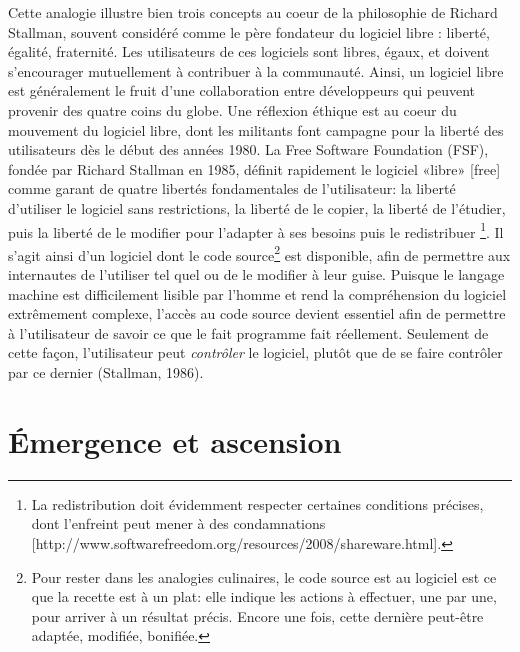\documentclass[
  letterpaper,
]{scrbook}
\begin{document}
Cette analogie illustre bien trois concepts au coeur de la philosophie
de Richard Stallman, souvent considéré comme le père fondateur du
logiciel libre : liberté, égalité, fraternité. Les utilisateurs de ces
logiciels sont libres, égaux, et doivent s'encourager mutuellement à
contribuer à la communauté. Ainsi, un logiciel libre est généralement le
fruit d'une collaboration entre développeurs qui peuvent provenir des
quatre coins du globe. Une réflexion éthique est au coeur du mouvement
du logiciel libre, dont les militants font campagne pour la liberté des
utilisateurs dès le début des années 1980. La Free Software Foundation
(FSF), fondée par Richard Stallman en 1985, définit rapidement le
logiciel «libre» {[}free{]} comme garant de quatre libertés
fondamentales de l'utilisateur: la liberté d'utiliser le logiciel sans
restrictions, la liberté de le copier, la liberté de l'étudier, puis la
liberté de le modifier pour l'adapter à ses besoins puis le redistribuer
\footnote{La redistribution doit évidemment respecter certaines
  conditions précises, dont l'enfreint peut mener à des condamnations
  {[}http://www.softwarefreedom.org/resources/2008/shareware.html{]}.}.
Il s'agit ainsi d'un logiciel dont le code source\footnote{Pour rester
  dans les analogies culinaires, le code source est au logiciel est ce
  que la recette est à un plat: elle indique les actions à effectuer,
  une par une, pour arriver à un résultat précis. Encore une fois, cette
  dernière peut-être adaptée, modifiée, bonifiée.} est disponible, afin
de permettre aux internautes de l'utiliser tel quel ou de le modifier à
leur guise. Puisque le langage machine est difficilement lisible par
l'homme et rend la compréhension du logiciel extrêmement complexe,
l'accès au code source devient essentiel afin de permettre à
l'utilisateur de savoir ce que le fait programme fait réellement.
Seulement de cette façon, l'utilisateur peut \emph{contrôler} le
logiciel, plutôt que de se faire contrôler par ce dernier (Stallman,
1986).

\hypertarget{uxe9mergence-et-ascension}{%
\section{Émergence et ascension}\label{uxe9mergence-et-ascension}}
\end{document}
